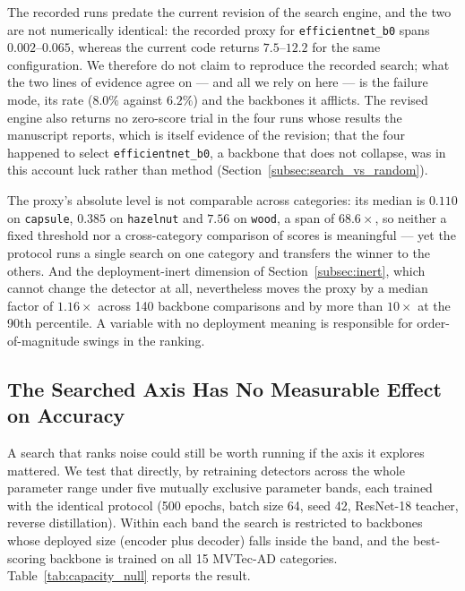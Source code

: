 The recorded runs predate the current revision of the search engine, and the two
are not numerically identical: the recorded proxy for \texttt{efficientnet\_b0}
spans $0.002$--$0.065$, whereas the current code returns $7.5$--$12.2$ for the
same configuration. We therefore do not claim to reproduce the recorded search;
what the two lines of evidence agree on --- and all we rely on here --- is the
failure mode, its rate ($8.0\%$ against $6.2\%$) and the backbones it afflicts.
The revised engine also returns no zero-score trial in the four runs whose results
the manuscript reports, which is itself evidence of the revision; that the four
happened to select \texttt{efficientnet\_b0}, a backbone that does not collapse,
was in this account luck rather than method
(Section~\ref{subsec:search_vs_random}).

The proxy's absolute level is not comparable across categories: its median is
$0.110$ on \texttt{capsule}, $0.385$ on \texttt{hazelnut} and $7.56$ on
\texttt{wood}, a span of $68.6\times$, so neither a fixed threshold nor a
cross-category comparison of scores is meaningful --- yet the protocol runs a
single search on one category and transfers the winner to the others. And the
deployment-inert dimension of Section~\ref{subsec:inert}, which cannot change the
detector at all, nevertheless moves the proxy by a median factor of $1.16\times$
across 140 backbone comparisons and by more than $10\times$ at the 90th
percentile. A variable with no deployment meaning is responsible for
order-of-magnitude swings in the ranking.

\subsection{The Searched Axis Has No Measurable Effect on Accuracy}
\label{subsec:capacity_null}

A search that ranks noise could still be worth running if the axis it explores
mattered. We test that directly, by retraining detectors across the whole
parameter range under five mutually exclusive parameter bands, each trained with
the identical protocol (500 epochs, batch size 64, seed 42, ResNet-18 teacher,
reverse distillation). Within each band the search is restricted to backbones
whose deployed size (encoder plus decoder) falls inside the band, and the
best-scoring backbone is trained on all 15 MVTec-AD categories.
Table~\ref{tab:capacity_null} reports the result.

